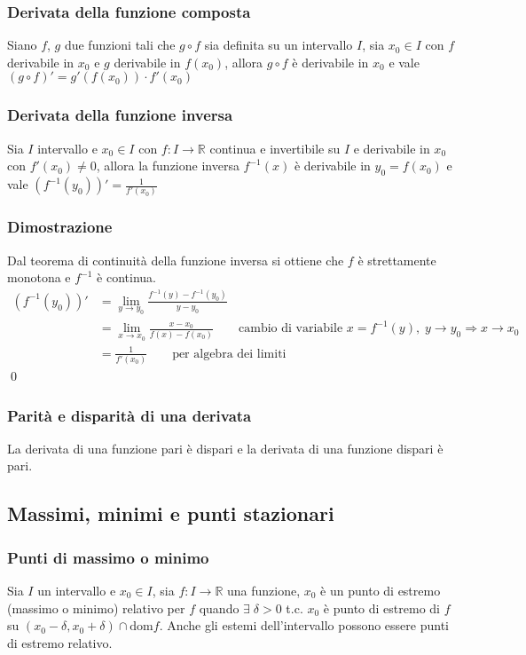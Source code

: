 \documentclass[a4paper]{article}
\newcommand\dom{\text{dom}}
\begin{document}
\subsubsection*{Derivata della funzione composta}
Siano \(f\), \(g\) due funzioni tali che \(g \circ f\) sia definita su un intervallo \(I\), sia \(x_0 \in I\) con \(f\) derivabile in \(x_0\)
e \(g\) derivabile in \(f(x_0)\), allora \(g \circ f\) è derivabile in \(x_0\) e vale \(\left(g \circ f\right)' = g'(f(x_0)) \cdot f'(x_0)\)

\subsubsection*{Derivata della funzione inversa}
Sia \(I\) intervallo e \(x_0 \in I\) con \(f:I \to \mathbb{R}\) continua e invertibile su \(I\) e derivabile in \(x_0\) con \(f'(x_0) \neq 0\),
allora la funzione inversa \(f^{-1}(x)\) è derivabile in \(y_0 = f(x_0)\) e vale \(\displaystyle \left(f^{-1}(y_0)\right)' = \frac{1}{f'(x_0)}\)

\subsubsection*{Dimostrazione}
Dal teorema di continuità della funzione inversa si ottiene che \(f\) è strettamente monotona e \(f^{-1}\) è continua.
\begin{align*}
	\left(f^{-1}(y_0)\right)' &= \lim_{y \to y_0} \frac{f^{-1}(y) - f^{-1}(y_0)}{y - y_0} \\
	&= \lim_{x \to x_0} \frac{x - x_0}{f(x) - f(x_0)} \qquad \text{cambio di variabile } x = f^{-1}(y), \; y \to y_0 \Rightarrow x \to x_0 \\
	&= \frac{1}{f'(x_0)} \qquad \text{per algebra dei limiti}
\end{align*} \qed

\subsubsection*{Parità e disparità di una derivata}
La derivata di una funzione pari è dispari e la derivata di una funzione dispari è pari.

\subsection{Massimi, minimi e punti stazionari}
\subsubsection*{Punti di massimo o minimo}
Sia \(I\) un intervallo e \(x_0 \in I\), sia \(f:I \to \mathbb{R}\) una funzione, \(x_0\) è un punto di estremo (massimo o minimo) relativo
per \(f\) quando \(\exists \; \delta > 0\) t.c. \(x_0\) è punto di estremo di \(f\) su \(\left(x_0 - \delta, x_0 + \delta\right) \cap \dom f\).
Anche gli estemi dell'intervallo possono essere punti di estremo relativo.
\end{document}
